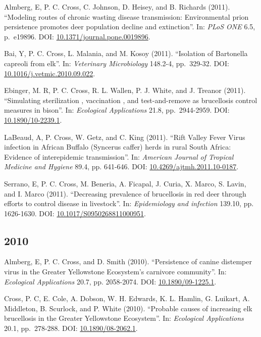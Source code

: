 \documentclass[12pt,]{article}
\begin{document}
Almberg, E, P. C. Cross, C. Johnson, D. Heisey, and B. Richards (2011).
``Modeling routes of chronic wasting disease transmission: Environmental
prion persistence promotes deer population decline and extinction''. In:
\emph{PLoS ONE} 6.5, p.~e19896. DOI:
\href{https://doi.org/10.1371\%2Fjournal.pone.0019896}{10.1371/journal.pone.0019896}.

Bai, Y, P. C. Cross, L. Malania, and M. Kosoy (2011). ``Isolation of
Bartonella capreoli from elk''. In: \emph{Veterinary Microbiology}
148.2-4, pp.~329-32. DOI:
\href{https://doi.org/10.1016\%2Fj.vetmic.2010.09.022}{10.1016/j.vetmic.2010.09.022}.

Ebinger, M. R, P. C. Cross, R. L. Wallen, P. J. White, and J. Treanor
(2011). ``Simulating sterilization , vaccination , and test-and-remove
as brucellosis control measures in bison''. In: \emph{Ecological
Applications} 21.8, pp.~2944-2959. DOI:
\href{https://doi.org/10.1890\%2F10-2239.1}{10.1890/10-2239.1}.

LaBeaud, A, P. Cross, W. Getz, and C. King (2011). ``Rift Valley Fever
Virus infection in African Buffalo (Syncerus caffer) herds in rural
South Africa: Evidence of interepidemic transmission''. In:
\emph{American Journal of Tropical Medicine and Hygiene} 89.4, pp.
641-646. DOI:
\href{https://doi.org/10.4269\%2Fajtmh.2011.10-0187}{10.4269/ajtmh.2011.10-0187}.

Serrano, E, P. C. Cross, M. Beneria, A. Ficapal, J. Curia, X. Marco, S.
Lavin, and I. Marco (2011). ``Decreasing prevalence of brucellosis in
red deer through efforts to control disease in livestock''. In:
\emph{Epidemiology and infection} 139.10, pp. 1626-1630. DOI:
\href{https://doi.org/10.1017\%2FS0950268811000951}{10.1017/S0950268811000951}.

\hypertarget{section-9}{%
\subsection{2010}\label{section-9}}

Almberg, E, P. C. Cross, and D. Smith (2010). ``Persistence of canine
distemper virus in the Greater Yellowstone Ecosystem's carnivore
community''. In: \emph{Ecological Applications} 20.7, pp. 2058-2074.
DOI: \href{https://doi.org/10.1890\%2F09-1225.1}{10.1890/09-1225.1}.

Cross, P. C, E. Cole, A. Dobson, W. H. Edwards, K. L. Hamlin, G.
Luikart, A. Middleton, B. Scurlock, and P. White (2010). ``Probable
causes of increasing elk brucellosis in the Greater Yellowstone
Ecosystem''. In: \emph{Ecological Applications} 20.1, pp.~278-288. DOI:
\href{https://doi.org/10.1890\%2F08-2062.1}{10.1890/08-2062.1}.
\end{document}
